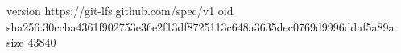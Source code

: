 version https://git-lfs.github.com/spec/v1
oid sha256:30ccba4361f902753e36e2f13df8725113c648a3635dec0769d9996ddaf5a89a
size 43840
